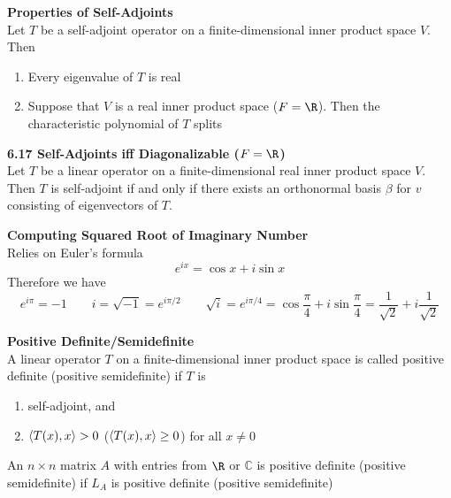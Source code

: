 \documentclass[11pt]{article}
\begin{document}
\begin{lemma*}
    \textbf{Properties of Self-Adjoints} \\ 
    Let $T$ be a self-adjoint operator on a finite-dimensional inner product space $V$. Then 
    \begin{enumerate}
        \item Every eigenvalue of $T$ is real 
        \item Suppose that $V$ is a real inner product space ($F=\R$). Then the characteristic polynomial of $T$ splits
    \end{enumerate}
\end{lemma*}


\begin{theorem*}
    \textbf{6.17 Self-Adjoints iff Diagonalizable ($F=\R$)} \\
    Let $T$ be a linear operator on a finite-dimensional real inner product space $V$. Then $T$ is self-adjoint if and only if there exists an orthonormal basis $\beta$ for $v$ consisting of eigenvectors of $T$.
\end{theorem*}


\begin{defn*}
    \textbf{Computing Squared Root of Imaginary Number} \\
    Relies on Euler's formula 
    \[
        e^{ix}=\cos x + i\sin x 
    \]
    Therefore we have 
    \[
        e^{i\pi} = -1 \qquad 
        i = \sqrt{-1} = e^{i\pi/2} \qquad 
        \sqrt{i} = e^{i \pi / 4} = \cos \frac{\pi}{4} + i \sin \frac{\pi}{4} = \frac{1}{\sqrt{2}} + i \frac{1}{\sqrt{2}}
    \]
\end{defn*}

\begin{defn*}
    \textbf{Positive Definite/Semidefinite} \\
    A linear operator $T$ on a finite-dimensional inner product space is called positive definite (positive semidefinite) if $T$ is 
    \begin{enumerate}
        \item self-adjoint, and 
        \item $\langle T(x),x\rangle >0$ ($\langle T(x),x\rangle \geq 0$) for all $x\neq 0$
    \end{enumerate}
    An $n\times n$ matrix $A$ with entries from $\R$ or $\mathbb{C}$ is positive definite (positive semidefinite) if $L_A$ is positive definite (positive semidefinite)
\end{defn*}
\end{document}
